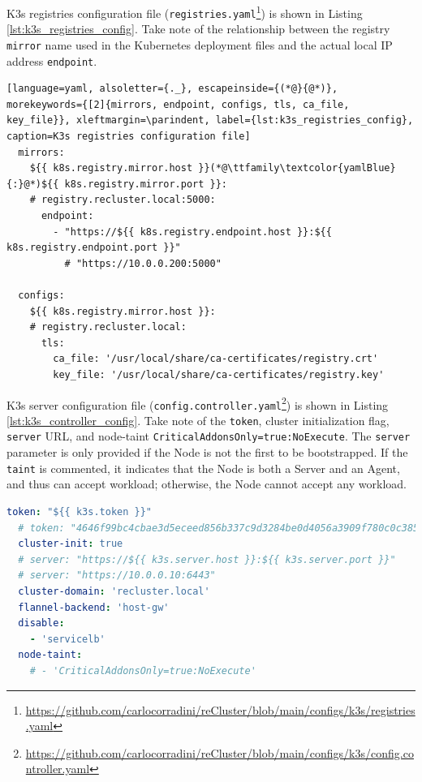 K3s registries configuration file (\texttt{registries.yaml}\footnote{\url{https://github.com/carlocorradini/reCluster/blob/main/configs/k3s/registries.yaml}})
is shown in Listing \ref{lst:k3s_registries_config}. Take note of the relationship
between the registry \texttt{mirror} name used in the Kubernetes deployment
files and the actual local IP address \texttt{endpoint}.

\begin{lstlisting}[language=yaml, alsoletter={._}, escapeinside={(*@}{@*)}, morekeywords={[2]{mirrors, endpoint, configs, tls, ca_file, key_file}}, xleftmargin=\parindent, label={lst:k3s_registries_config}, caption=K3s registries configuration file]
  mirrors:
    ${{ k8s.registry.mirror.host }}(*@\ttfamily\textcolor{yamlBlue}{:}@*)${{ k8s.registry.mirror.port }}:
    # registry.recluster.local:5000:
      endpoint:
        - "https://${{ k8s.registry.endpoint.host }}:${{ k8s.registry.endpoint.port }}"
          # "https://10.0.0.200:5000"

  configs:
    ${{ k8s.registry.mirror.host }}:
    # registry.recluster.local:
      tls:
        ca_file: '/usr/local/share/ca-certificates/registry.crt'
        key_file: '/usr/local/share/ca-certificates/registry.key'
\end{lstlisting}

K3s server configuration file (\texttt{config.controller.yaml}\footnote{\url{https://github.com/carlocorradini/reCluster/blob/main/configs/k3s/config.controller.yaml}})
is shown in Listing \ref{lst:k3s_controller_config}. Take note of the \texttt{token},
cluster initialization flag, \texttt{server} URL, and node-taint \texttt{CriticalAddonsOnly=true:NoExecute}.
The \texttt{server} parameter is only provided if the Node is not the first to
be bootstrapped. If the \texttt{taint} is commented, it indicates that the Node is
both a Server and an Agent, and thus can accept workload; otherwise, the Node
cannot accept any workload.

\begin{lstlisting}[language=yaml, alsoletter={.-}, morekeywords={[2]{token, cluster-init, cluster-domain, flannel-backend, disable, node-taint}}, xleftmargin=\parindent, label={lst:k3s_controller_config}, caption=K3s server configuration file]
  token: "${{ k3s.token }}"
  # token: "4646f99bc4cbae3d5eceed856b337c9d3284be0d4056a3909f780c0c385fbf93"
  cluster-init: true
  # server: "https://${{ k3s.server.host }}:${{ k3s.server.port }}"
  # server: "https://10.0.0.10:6443"
  cluster-domain: 'recluster.local'
  flannel-backend: 'host-gw'
  disable:
    - 'servicelb'
  node-taint:
    # - 'CriticalAddonsOnly=true:NoExecute'
\end{lstlisting}

